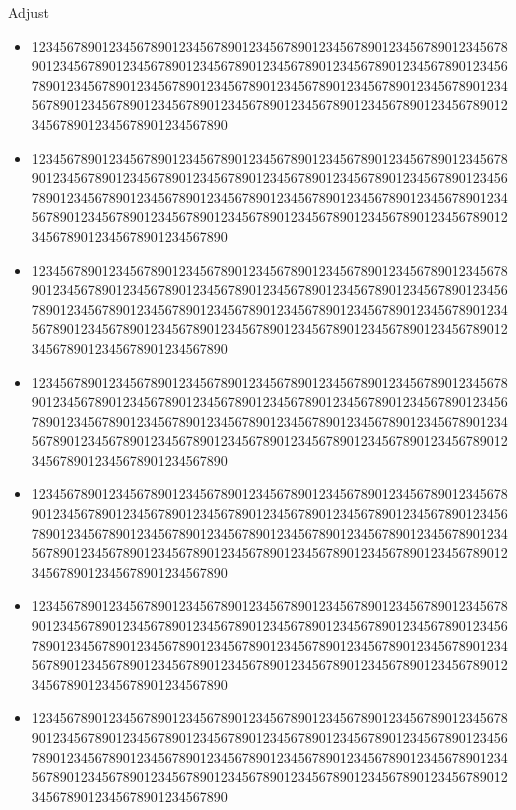 \documentclass[a4paper,12pt]{article}
\begin{document}
\begin{slide}
\centerline{\Huge Adjust  }\vspace{0.5cm}
    \begin{itemize}
    \item 123456789012345678901234567890123456789012345678901234567890123456789012345678901234567890123456789012345678901234567890123456789012345678901234567890123456789012345678901234567890123456789012345678901234567890123456789012345678901234567890123456789012345678901234567890123456789012345678901234567890
    \item 123456789012345678901234567890123456789012345678901234567890123456789012345678901234567890123456789012345678901234567890123456789012345678901234567890123456789012345678901234567890123456789012345678901234567890123456789012345678901234567890123456789012345678901234567890123456789012345678901234567890
    \item 123456789012345678901234567890123456789012345678901234567890123456789012345678901234567890123456789012345678901234567890123456789012345678901234567890123456789012345678901234567890123456789012345678901234567890123456789012345678901234567890123456789012345678901234567890123456789012345678901234567890
    \item 123456789012345678901234567890123456789012345678901234567890123456789012345678901234567890123456789012345678901234567890123456789012345678901234567890123456789012345678901234567890123456789012345678901234567890123456789012345678901234567890123456789012345678901234567890123456789012345678901234567890
    \item 123456789012345678901234567890123456789012345678901234567890123456789012345678901234567890123456789012345678901234567890123456789012345678901234567890123456789012345678901234567890123456789012345678901234567890123456789012345678901234567890123456789012345678901234567890123456789012345678901234567890
    \item 123456789012345678901234567890123456789012345678901234567890123456789012345678901234567890123456789012345678901234567890123456789012345678901234567890123456789012345678901234567890123456789012345678901234567890123456789012345678901234567890123456789012345678901234567890123456789012345678901234567890
    \item 123456789012345678901234567890123456789012345678901234567890123456789012345678901234567890123456789012345678901234567890123456789012345678901234567890123456789012345678901234567890123456789012345678901234567890123456789012345678901234567890123456789012345678901234567890123456789012345678901234567890                

\end{itemize}
\end{slide}
\end{document}
